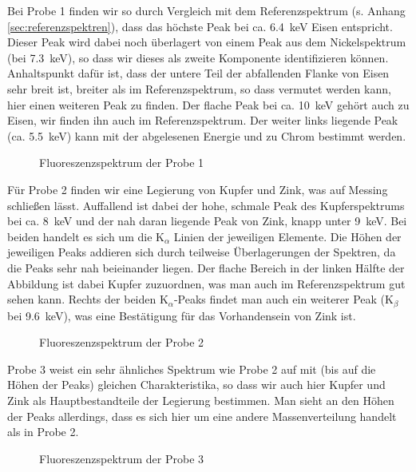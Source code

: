 \documentclass[11pt, a4paper]{article}
\begin{document}
Bei Probe 1 finden wir so durch Vergleich mit dem Referenzspektrum (s. Anhang \ref{sec:referenzspektren}), dass das höchste Peak bei ca. \SI{6.4}{\kilo\electronvolt} Eisen entspricht.
Dieser Peak wird dabei noch überlagert von einem Peak aus dem Nickelspektrum (bei \SI{7.3}{\kilo\electronvolt}), so dass wir dieses als zweite Komponente identifizieren können.
Anhaltspunkt dafür ist, dass der untere Teil der abfallenden Flanke von Eisen sehr breit ist, breiter als im Referenzspektrum, so dass vermutet werden kann, hier einen weiteren Peak zu finden.
Der flache Peak bei ca. \SI{10}{\kilo\electronvolt} gehört auch zu Eisen, wir finden ihn auch im Referenzspektrum.
Der weiter links liegende Peak (ca. \SI{5.5}{\kilo\electronvolt}) kann mit der abgelesenen Energie und \cite{booklet} zu Chrom bestimmt werden.

\begin{figure}[!h]
\centering

\caption{Fluoreszenzspektrum der Probe 1}
\label{fig:probe1}
\end{figure}

Für Probe 2 finden wir eine Legierung von Kupfer und Zink, was auf Messing schließen lässt.
Auffallend ist dabei der hohe, schmale Peak des Kupferspektrums bei ca. \SI{8}{\kilo\electronvolt} und der nah daran liegende Peak von Zink, knapp unter \SI{9}{\kilo\electronvolt}.
Bei beiden handelt es sich um die K$_{\alpha}$ Linien der jeweiligen Elemente.
Die Höhen der jeweiligen Peaks addieren sich durch teilweise Überlagerungen der Spektren, da die Peaks sehr nah beieinander liegen.
Der flache Bereich in der linken Hälfte der Abbildung ist dabei Kupfer zuzuordnen, was man auch im Referenzspektrum gut sehen kann.
Rechts der beiden K$_{\alpha}$-Peaks findet man auch ein weiterer Peak (K$_{\beta}$ bei \SI{9.6}{\kilo\electronvolt}), was eine Bestätigung für das Vorhandensein von Zink ist.

\begin{figure}[!h]
\centering

\caption{Fluoreszenzspektrum der Probe 2}
\label{fig:probe2}
\end{figure}

Probe 3 weist ein sehr ähnliches Spektrum wie Probe 2 auf mit (bis auf die Höhen der Peaks) gleichen Charakteristika, so dass wir auch hier Kupfer und Zink als Hauptbestandteile der Legierung bestimmen.
Man sieht an den Höhen der Peaks allerdings, dass es sich hier um eine andere Massenverteilung handelt als in Probe 2.

\begin{figure}[!h]
\centering

\caption{Fluoreszenzspektrum der Probe 3}
\label{fig:probe3}
\end{figure}
\end{document}
